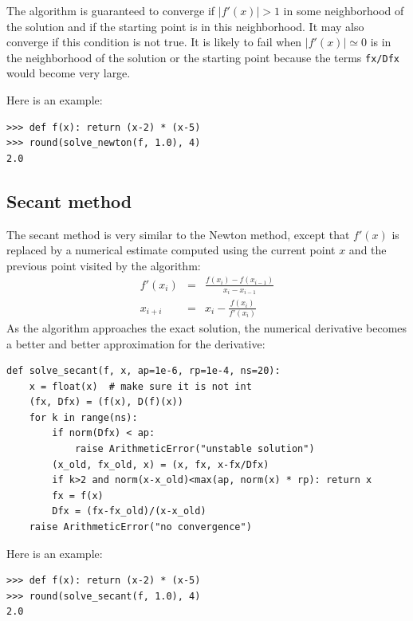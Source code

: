 \documentclass[justified, sixbynine]{tufte-book}
\def\ft{\small\tt}
\theoremstyle{plain}%
\newtheorem * {corollary}{Corollary}
\theoremstyle{definition}
\theoremstyle{remark}
\newtheorem * {remark}{Remark}
\newtheorem * {note}{Note}
\begin{document}
\begin{fullwidth}
The algorithm is guaranteed to converge if $|f'(x)|>1$ in some neighborhood of the solution and if the starting point is in this neighborhood. It may also converge if this condition is not true. It is likely to fail when $|f'(x)|\simeq 0$ is in the neighborhood of the solution or the starting point because the terms {\ft fx/Dfx} would become very large.

Here is an example:

\begin{lstlisting}[caption={in file: {\ft nlib.py}}]
>>> def f(x): return (x-2) * (x-5)
>>> round(solve_newton(f, 1.0), 4)
2.0
\end{lstlisting}

\goodbreak\subsection{Secant method}


The secant method is very similar to the Newton method, except that $f'(x)$ is replaced by a numerical estimate computed using the current point $x$ and the previous point visited by the algorithm:
\begin{eqnarray}
f'(x_i) &=& \frac{f(x_i)-f(x_{i-1})}{x_i-x_{i-1}} \\
x_{i+i} &=& x_i - \frac{f(x_i)}{f'(x_i)}
\end{eqnarray}
As the algorithm approaches the exact solution, the numerical derivative becomes a better and better approximation for the derivative:

\begin{lstlisting}[caption={in file: {\ft nlib.py}}]
def solve_secant(f, x, ap=1e-6, rp=1e-4, ns=20):
    x = float(x)  # make sure it is not int
    (fx, Dfx) = (f(x), D(f)(x))
    for k in range(ns):
        if norm(Dfx) < ap:
            raise ArithmeticError("unstable solution")
        (x_old, fx_old, x) = (x, fx, x-fx/Dfx)
        if k>2 and norm(x-x_old)<max(ap, norm(x) * rp): return x
        fx = f(x)
        Dfx = (fx-fx_old)/(x-x_old)
    raise ArithmeticError("no convergence")
\end{lstlisting}

Here is an example:

\begin{lstlisting}[caption={in file: {\ft nlib.py}}]
>>> def f(x): return (x-2) * (x-5)
>>> round(solve_secant(f, 1.0), 4)
2.0
\end{lstlisting}


\end{fullwidth}
\end{document}
